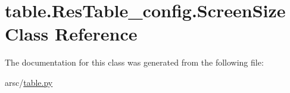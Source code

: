 \hypertarget{classtable_1_1ResTable__config_1_1ScreenSize}{}\section{table.\+Res\+Table\+\_\+config.\+Screen\+Size Class Reference}
\label{classtable_1_1ResTable__config_1_1ScreenSize}


The documentation for this class was generated from the following file\+:\begin{DoxyCompactItemize}
\item 
arsc/\mbox{\hyperlink{table_8py}{table.\+py}}\end{DoxyCompactItemize}
